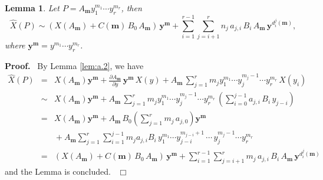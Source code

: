 \documentclass[preprint, 12pt]{elsarticle}
\newtheorem{lem}[thm]{Lemma}
\numberwithin{equation}{section}
\newenvironment{proof}[1][Proof]{\textbf{#1.}\ }{\ $\Box$}
\begin{document}
\begin{lem}
\label{lem:a.6} Let $P = A_{\mathbf{m}}y_1^{m_1}\cdots y_r^{m_r}$,
then
$$
\hat{X}(P)\sim (X(A_{\mathbf{m}}) + C({\mathbf{m}})\, B_0\,
A_{\mathbf{m}})\,\mathbf{y}^{\mathbf{m}} + \sum_{i =
1}^{r-1}\sum_{j=i+1}^rn_j\,a_{j,i}\,B_i\,A_\mathbf{m}\,\mathbf{y}^{d_i^j(\mathbf{m})},
$$
where $\mathbf{y}^{\mathbf{m}} = y^{m_1}\cdots y_r^{m_r}$.
\end{lem}
\begin{proof} By Lemma \ref{lem:a.2}, we have
\begin{eqnarray*}
\hat{X}(P) &=& X(A_\mathbf{m})\mathbf{y}^{\mathbf{m}} +
\frac{\partial A_{\mathbf{m}}}{\partial
y}\,\mathbf{y}^{\mathbf{m}}\,X(y) + A_\mathbf{m}\,\sum_{j=1}^r m_j
y_1^{m_1}\cdots
y_j^{m_j-1}\cdots y_r^{m_r}\,X(y_i)\\
&\sim&X(A_\mathbf{m})\mathbf{y}^{\mathbf{m}} +
A_\mathbf{m}\,\sum_{j=1}^r m_j y_1^{m_1}\cdots y_j^{m_j-1}\cdots
y_r^{m_r}\,(\sum_{i=0}^{j-1}a_{j,i}\,B_i\,y_{j-i})\\
&=&X(A_\mathbf{m})\mathbf{y}^{\mathbf{m}} +
A_\mathbf{m}\,B_0(\sum_{j =
1}^rm_j\,a_{j,0})\mathbf{y}^{\mathbf{m}}\\
&&{} + A_\mathbf{m}\sum_{j=1}^r\sum_{i = 1}^{j-1}m_ja_{j,i}B_i\,
y_1^{m_1}\cdots
y_{j-i}^{m_{j-i}+1}\,\cdots\,y_j^{m_j-1}\cdots y_r^{m_r}\\
&=&(X(A_{\mathbf{m}}) + C({\mathbf{m}})\, B_0\,
A_{\mathbf{m}})\,\mathbf{y}^{\mathbf{m}} + \sum_{i =
1}^{r-1}\sum_{j=i+1}^rm_j\,a_{j,i}\,B_i\,A_\mathbf{m}\,\mathbf{y}^{d_i^j(\mathbf{m})}
\end{eqnarray*}
and the Lemma is concluded.
\end{proof}
\end{document}
